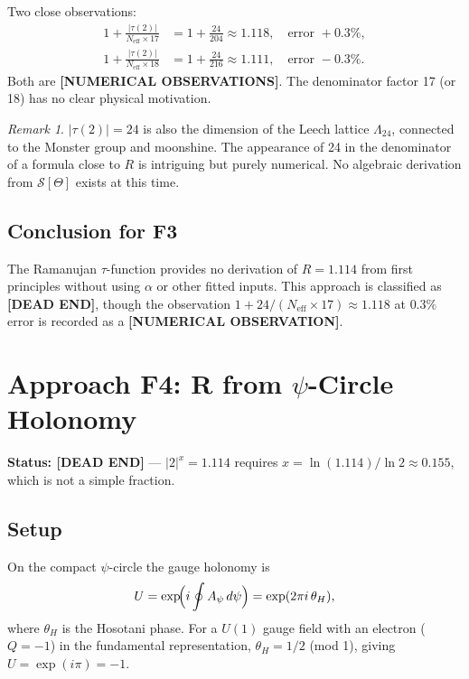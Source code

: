 \documentclass[11pt,a4paper]{article}
\theoremstyle{remark}
\newtheorem{remark}{Remark}
\begin{document}
Two close observations:
\begin{align}
  1 + \frac{|\tau(2)|}{N_{\mathrm{eff}} \times 17} &= 1 + \frac{24}{204} \approx 1.118, \quad \text{error } +0.3\%, \\
  1 + \frac{|\tau(2)|}{N_{\mathrm{eff}} \times 18} &= 1 + \frac{24}{216} \approx 1.111, \quad \text{error } -0.3\%.
\end{align}
Both are \textbf{[NUMERICAL OBSERVATIONS]}.  The denominator factor 17
(or 18) has no clear physical motivation.

\begin{remark}
  $|\tau(2)| = 24$ is also the dimension of the Leech lattice \(\Lambda_{24}\),
  connected to the Monster group and moonshine.  The appearance of 24 in the
  denominator of a formula close to $R$ is intriguing but purely numerical.
  No algebraic derivation from $\mathcal{S}[\Theta]$ exists at this time.
\end{remark}

\subsection{Conclusion for F3}

The Ramanujan $\tau$-function provides no derivation of $R = 1.114$ from
first principles without using $\alpha$ or other fitted inputs.  This approach
is classified as \textbf{[DEAD END]}, though the observation
$1 + 24/(N_{\mathrm{eff}} \times 17) \approx 1.118$ at $0.3\%$ error is
recorded as a \textbf{[NUMERICAL OBSERVATION]}.

\section{Approach F4: R from $\psi$-Circle Holonomy}
\label{sec:F4_holonomy}

\textbf{Status: [DEAD END]} — $|2|^x = 1.114$ requires $x = \ln(1.114)/\ln 2
\approx 0.155$, which is not a simple fraction.

\subsection{Setup}

On the compact $\psi$-circle the gauge holonomy is
\begin{equation}
  U = \exp\!\Bigl(i\oint A_\psi\,d\psi\Bigr) = \exp(2\pi i\,\theta_H),
\end{equation}
where $\theta_H$ is the Hosotani phase.  For a $U(1)$ gauge field with
an electron ($Q = -1$) in the fundamental representation,
$\theta_H = 1/2$ (mod 1), giving $U = \exp(i\pi) = -1$.
\end{document}
